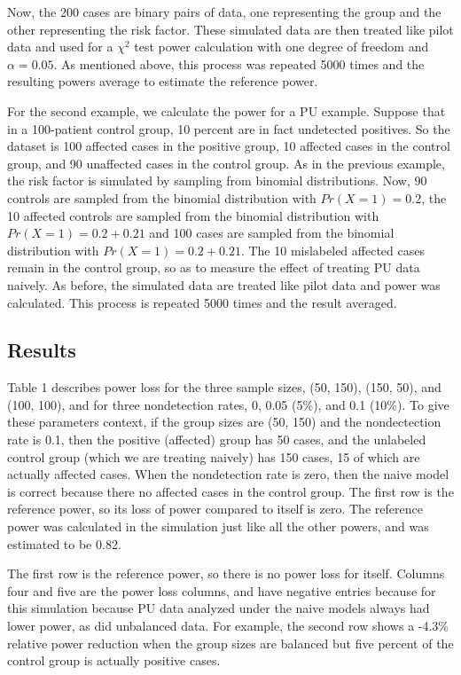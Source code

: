 \documentclass[
]{article}
\begin{document}
Now, the 200 cases are binary pairs of data, one representing the group
and the other representing the risk factor. These simulated data are
then treated like pilot data and used for a \(\chi^2\) test power
calculation with one degree of freedom and \(\alpha = 0.05\). As
mentioned above, this process was repeated 5000 times and the resulting
powers average to estimate the reference power.

For the second example, we calculate the power for a PU example. Suppose
that in a 100-patient control group, 10 percent are in fact undetected
positives. So the dataset is 100 affected cases in the positive group,
10 affected cases in the control group, and 90 unaffected cases in the
control group. As in the previous example, the risk factor is simulated
by sampling from binomial distributions. Now, 90 controls are sampled
from the binomial distribution with \(Pr(X=1) = 0.2\), the 10 affected
controls are sampled from the binomial distribution with
\(Pr(X=1) = 0.2+ 0.21\) and 100 cases are sampled from the binomial
distribution with \(Pr(X=1) = 0.2 + 0.21\). The 10 mislabeled affected
cases remain in the control group, so as to measure the effect of
treating PU data naively. As before, the simulated data are treated like
pilot data and power was calculated. This process is repeated 5000 times
and the result averaged.

\hypertarget{results-1}{%
\subsection{Results}\label{results-1}}

Table 1 describes power loss for the three sample sizes, (50, 150),
(150, 50), and (100, 100), and for three nondetection rates, 0, 0.05
(5\%), and 0.1 (10\%). To give these parameters context, if the group
sizes are (50, 150) and the nondectection rate is 0.1, then the positive
(affected) group has 50 cases, and the unlabeled control group (which we
are treating naively) has 150 cases, 15 of which are actually affected
cases. When the nondetection rate is zero, then the naive model is
correct because there no affected cases in the control group. The first
row is the reference power, so its loss of power compared to itself is
zero. The reference power was calculated in the simulation just like all
the other powers, and was estimated to be 0.82.

The first row is the reference power, so there is no power loss for
itself. Columns four and five are the power loss columns, and have
negative entries because for this simulation because PU data analyzed
under the naive models always had lower power, as did unbalanced data.
For example, the second row shows a -4.3\% relative power reduction when
the group sizes are balanced but five percent of the control group is
actually positive cases.
\end{document}
